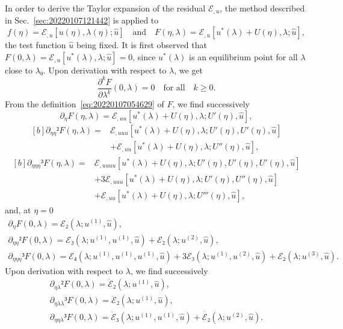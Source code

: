 \documentclass[12pt, final]{scrartcl}
\theoremstyle{definition}
\newcommand{\E}{\mathcal E}
\newcommand{\order}[2][1]{#2^{(#1)}}
\begin{document}
In order to derive the Taylor expansion of the residual $\E_{,u}$, the method
described in Sec.~\ref{sec:20220107121442} is applied to
\begin{equation}
  \label{eq:20220107054629}
  f(η) = \E_{, u} [u(η), \lambda(η); \hat{u}]
  \quad \text{and} \quad
  F(η, \lambda) = \E_{, u}[u^{\ast}(\lambda) + U(η), \lambda; \hat{u}],
\end{equation}
the test function $\hat{u}$ being fixed. It is first observed that
$F(0, \lambda) = \E_{, u} [u^{\ast} (\lambda), \lambda; \hat{u}] = 0$, since $u^{\ast}(\lambda)$ is
an equilibrium point for all $\lambda$ close to $\lambda₀$. Upon derivation with respect
to $\lambda$, we get
\begin{equation*}
  \frac{∂^k F}{∂ \lambda^k}(0, \lambda) = 0 \quad \text{for all} \quad k ≥ 0.
\end{equation*}
From the definition~\eqref{eq:20220107054629} of $F$, we find successively
\begin{equation*}
  ∂_{η}F(η, \lambda) = \E_{, u u}[u^{\ast}(\lambda) + U(η), \lambda; U'(η), \hat{u}],
\end{equation*}
\begin{equation*}
  \begin{aligned}[b]
    ∂_{η η}² F(η, \lambda) ={}
    & \E_{, uuu}[u^{\ast}(\lambda) + U(η), \lambda; U'(η), U'(η), \hat{u}]\\
    & + \E_{, uu} [u^{\ast}(\lambda) + U(η), \lambda; U''(η), \hat{u}],
  \end{aligned}
\end{equation*}
\begin{equation*}
  \begin{aligned}[b]
    ∂_{ηηη}³ F(η, \lambda) ={}
    & \E_{, uuuu}[u^{\ast}(\lambda) + U(η), \lambda; U'(η), U'(η), U'(η), \hat{u}]\\
    & + 3\E_{, u u u}[u^{\ast}(\lambda) + U(η), \lambda; U'(η), U''(η), \hat{u}]\\
    & + \E_{, uu}[u^{\ast}(\lambda) + U(η), \lambda; U'''(η), \hat{u}],
  \end{aligned}
\end{equation*}
and, at $η = 0$
\begin{gather*}
  ∂_{η}F(0, \lambda) = \E₂(\lambda; \order[1]u, \hat{u}),\\
  ∂_{ηη}² F(0, \lambda) = \E₃(\lambda; \order[1]u, \order[1]u, \hat{u}) + \E₂(\lambda; \order[2]u, \hat{u}),\\
  ∂_{ηηη}³ F(0, \lambda) = \E₄(\lambda; \order[1]u, \order[1]u, \order[1]u, \hat{u}) + 3\E₃(\lambda; \order[1]u, \order[2]u, \hat{u}) + \E₂(\lambda; \order[3]u, \hat{u}).
\end{gather*}
Upon derivation with respect to $\lambda$, we find successively
\begin{gather*}
  ∂_{η\lambda}² F(0, \lambda) = \dot{\E}₂(\lambda; \order[1]u, \hat{u}),\\
  ∂_{η\lambda\lambda}³ F(0, \lambda) = \ddot{\E}₂(\lambda; \order[1]u, \hat{u}),\\
  ∂_{ηη\lambda}³ F(0, \lambda) = \dot{\E}₃(\lambda; \order[1]u, \order[1]u, \hat{u}) + \dot{\E₂}(\lambda; \order[2]u, \hat{u}).
\end{gather*}
\end{document}
